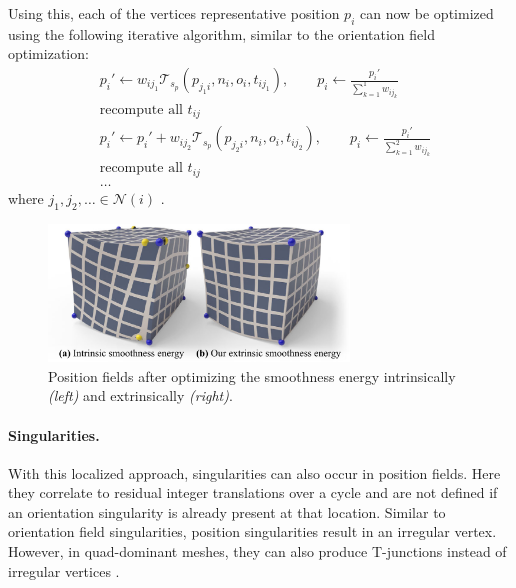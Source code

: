 \documentclass{ACGSeminar}
\begin{document}
Using this, each of the vertices representative position $p_i$ can now be optimized using the following iterative algorithm, similar to the orientation field optimization:
\begin{equation*}
\begin{split}
	& p_i' \leftarrow w_{ij_1} \mathcal{T}_{s_p}(p_{j_1i}, n_i, o_i, t_{ij_1}), \qquad p_i \leftarrow \frac{p_i'}{\sum_{k=1}^1 w_{ij_k}} \\
	& \textrm{recompute all } t_{ij}\\
	& p_i' \leftarrow p_i' + w_{ij_2} \mathcal{T}_{s_p}(p_{j_2i}, n_i, o_i, t_{ij_2}), \qquad p_i \leftarrow \frac{p_i'}{\sum_{k=1}^2 w_{ij_k}} \\
	& \textrm{recompute all } t_{ij}\\
	& \dots
\end{split}
\end{equation*}
where $j_1, j_2, \dots \in \mathcal{N}(i)$ \cite{jakob2015instant}.

\begin{figure}[htb!]
	\begin{centering}
		\includegraphics[width=8cm]{img/position-field-illustration.png}\par
	\end{centering}
	\caption{Position fields after optimizing the smoothness energy intrinsically \textit{(left)} and extrinsically \textit{(right)}. \cite{jakob2015instant}}
	\label{fig:position-field-illustration}
\end{figure}

\paragraph{Singularities.}
With this localized approach, singularities can also occur in position fields. Here they correlate to residual integer translations over a cycle and are not defined if an orientation singularity is already present at that location. Similar to orientation field singularities, position singularities result in an irregular vertex. However, in quad-dominant meshes, they can also produce T-junctions instead of irregular vertices \cite{jakob2015instant}.
\end{document}
